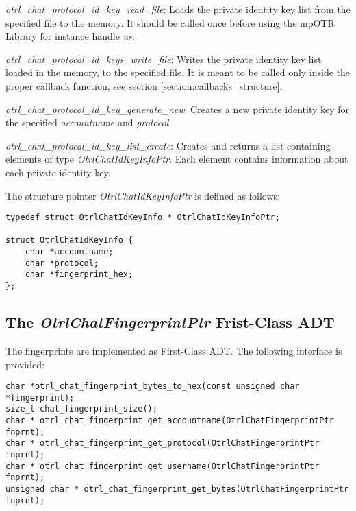 \begin{description}
  \item \emph{otrl\_chat\_protocol\_id\_key\_read\_file}: Loads the private identity key list from the specified file to the memory. It should be called once before using the mpOTR Library for instance handle \emph{us}.
  
  \item \emph{otrl\_chat\_protocol\_id\_keys\_write\_file}: Writes the private identity key list loaded in the memory, to the specified file. It is meant to be called only inside the proper callback function, see section \ref{section:callbacks_structure}.
  
  \item \emph{otrl\_chat\_protocol\_id\_key\_generate\_new}: Creates a new private identity key for the specified \emph{accountname} and \emph{protocol}.
  
  \item \emph{otrl\_chat\_protocol\_id\_key\_list\_create}: Creates and returns a list containing elements of type \emph{OtrlChatIdKeyInfoPtr}. Each element contains information about each private identity key.

\end{description}

The structure pointer \emph{OtrlChatIdKeyInfoPtr} is defined as follows:
\begin{lstlisting}[caption={OtrlChatIdKeyInfoPtr definition}]
typedef struct OtrlChatIdKeyInfo * OtrlChatIdKeyInfoPtr;

struct OtrlChatIdKeyInfo {
	char *accountname;
	char *protocol;
	char *fingerprint_hex;
};
\end{lstlisting}

\subsection{The \emph{OtrlChatFingerprintPtr} Frist-Class ADT}
The fingerprints are implemented as First-Class ADT. The following interface is provided:

\begin{lstlisting}[caption={OtrlChatFingerprintPtr Frist-Class ADT interface}]
char *otrl_chat_fingerprint_bytes_to_hex(const unsigned char *fingerprint);
size_t chat_fingerprint_size();
char * otrl_chat_fingerprint_get_accountname(OtrlChatFingerprintPtr fnprnt);
char * otrl_chat_fingerprint_get_protocol(OtrlChatFingerprintPtr fnprnt);
char * otrl_chat_fingerprint_get_username(OtrlChatFingerprintPtr fnprnt);
unsigned char * otrl_chat_fingerprint_get_bytes(OtrlChatFingerprintPtr fnprnt);
\end{lstlisting}

